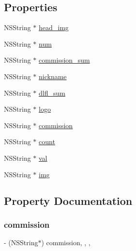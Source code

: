 \subsection*{Properties}
\begin{DoxyCompactItemize}
\item 
N\+S\+String $\ast$ \mbox{\hyperlink{interface_f_n_hero_rank_model_ad825d14511720a4c9b5102f06f2cb469}{head\+\_\+img}}
\item 
N\+S\+String $\ast$ \mbox{\hyperlink{interface_f_n_hero_rank_model_a59d91becba9411fe85cae3bfc68c9e54}{num}}
\item 
N\+S\+String $\ast$ \mbox{\hyperlink{interface_f_n_hero_rank_model_a56806bfa9b8bac215bffe91b9904ac9e}{commission\+\_\+sum}}
\item 
N\+S\+String $\ast$ \mbox{\hyperlink{interface_f_n_hero_rank_model_a3f27d2661e161a233ac0cd323397daf2}{nickname}}
\item 
N\+S\+String $\ast$ \mbox{\hyperlink{interface_f_n_hero_rank_model_a9273cf5aa69952f9532d78e3401a45e8}{dlfl\+\_\+sum}}
\item 
N\+S\+String $\ast$ \mbox{\hyperlink{interface_f_n_hero_rank_model_aaf5e77ad8ba5dcbb883519161132da71}{logo}}
\item 
N\+S\+String $\ast$ \mbox{\hyperlink{interface_f_n_hero_rank_model_a4984d1e891e21e89b7b3e525794cd7a2}{commission}}
\item 
N\+S\+String $\ast$ \mbox{\hyperlink{interface_f_n_hero_rank_model_aff266bec366091e6ffcae0499b740c3b}{count}}
\item 
N\+S\+String $\ast$ \mbox{\hyperlink{interface_f_n_hero_rank_model_a3a9bd79e2a68baa0cd096f903674f577}{val}}
\item 
N\+S\+String $\ast$ \mbox{\hyperlink{interface_f_n_hero_rank_model_adc2285d763cead65341d47fbb54a04a9}{img}}
\end{DoxyCompactItemize}


\subsection{Property Documentation}
\mbox{\label{interface_f_n_hero_rank_model_a4984d1e891e21e89b7b3e525794cd7a2}} 
\subsubsection{\texorpdfstring{commission}{commission}}
{\footnotesize\ttfamily -\/ (N\+S\+String$\ast$) commission\hspace{0.3cm}{\ttfamily [read]}, {\ttfamily [write]}, {\ttfamily [nonatomic]}, {\ttfamily [copy]}}

